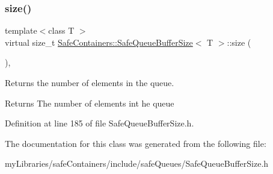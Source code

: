 \subsubsection{\texorpdfstring{size()}{size()}}
{\footnotesize\ttfamily template$<$class T $>$ \\
virtual size\+\_\+t \mbox{\hyperlink{classSafeContainers_1_1SafeQueueBufferSize}{Safe\+Containers\+::\+Safe\+Queue\+Buffer\+Size}}$<$ T $>$\+::size (\begin{DoxyParamCaption}{ }\end{DoxyParamCaption})\hspace{0.3cm}{\ttfamily [inline]}, {\ttfamily [virtual]}}



Returns the number of elements in the queue. 

\begin{DoxyReturn}{Returns}
The number of elements int he queue 
\end{DoxyReturn}


Definition at line 185 of file Safe\+Queue\+Buffer\+Size.\+h.



The documentation for this class was generated from the following file\+:\begin{DoxyCompactItemize}
\item 
my\+Libraries/safe\+Containers/include/safe\+Queues/Safe\+Queue\+Buffer\+Size.\+h\end{DoxyCompactItemize}
